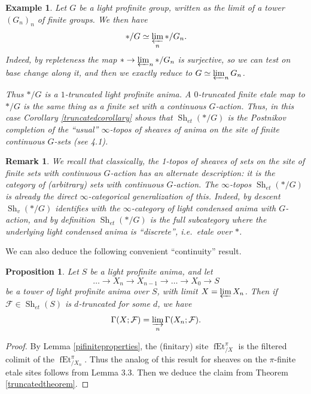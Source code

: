 \documentclass[12pt]{article}
\newtheorem{proposition}[theorem]{Proposition}
\newtheorem{example}[theorem]{Example}
\newtheorem{remark}[theorem]{Remark}
\newcommand{\on}{\operatorname}
\begin{document}
\begin{example}\label{profgpexample}
Let $G$ be a light profinite group, written as the limit of a tower $(G_n)_n$ of finite groups.  We then have
$$\ast/G \simeq \varprojlim_n \ast/G_n.$$
Indeed, by repleteness the map $\ast \rightarrow \varprojlim_n \ast/G_n$ is surjective, so we can test on base change along it, and then we exactly reduce to $G\simeq \varprojlim_n G_n$.

Thus $\ast/G$ is a $1$-truncated light profinite anima.  A $0$-truncated finite etale map to $\ast/G$ is the same thing as a finite set with a continuous $G$-action.  Thus, in this case Corollary \ref{truncatedcorollary} shows that $\on{Sh}_{et}(\ast/G)$ is the Postnikov completion of the ``usual'' $\infty$-topos of sheaves of anima on the site of finite continuous $G$-sets (see \cite{ClausenHyper} 4.1).
\end{example}

\begin{remark}
We recall that classically, the 1-topos of sheaves of sets on the site of finite sets with continuous $G$-action has an alternate description: it is the category of (arbitrary) sets with continuous $G$-action.  The $\infty$-topos $\on{Sh}_{et}(\ast/G)$ is already the direct $\infty$-categorical generalization of this.  Indeed, by descent $\on{Sh}_v(\ast/G)$ identifies with the $\infty$-category of light condensed anima with $G$-action, and by definition $\on{Sh}_{et}(\ast/G)$ is the full subcategory where the underlying light condensed anima is ``discrete'', i.e.\ etale over $\ast$.
\end{remark}

We can also deduce the following convenient ``continuity'' result.

\begin{proposition}\label{procontinuity}
Let $S$ be a light profinite anima, and let
$$\ldots \to X_n \to X_{n-1} \to \ldots \to X_0 \to S$$
be a tower of light profinite anima over $S$, with limit $X=\varprojlim X_n$.  Then if $\mathcal{F}\in\on{Sh}_{et}(S)$ is $d$-truncated for some $d$, we have
$$\Gamma(X;\mathcal{F})=\varinjlim_n  \Gamma(X_n;\mathcal{F}).$$
\end{proposition}
\begin{proof}
By Lemma \ref{pifiniteproperties}, the (finitary) site $\on{fEt}^\pi_{/X}$ is the filtered colimit of the $\on{fEt}^{\pi}_{/X_n}$.  Thus the analog of this result for sheaves on the $\pi$-finite etale sites follows from \cite{ClausenHyper} Lemma 3.3.  Then we deduce the claim from Theorem \ref{truncatedtheorem}.
\end{proof}
\end{document}

